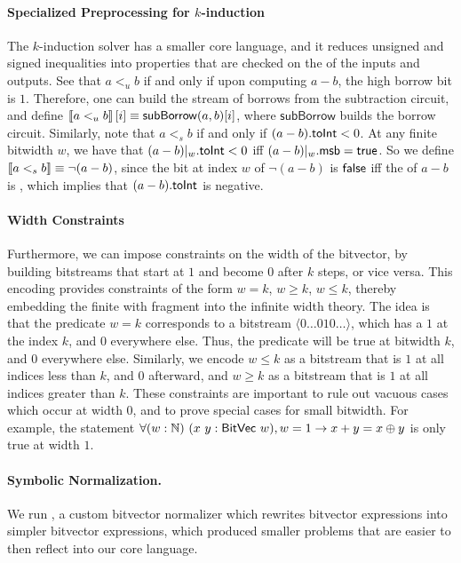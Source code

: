 \paragraph{Specialized Preprocessing for $k$-induction}
The $k$-induction solver has a smaller core language, and it reduces unsigned and signed inequalities
into properties that are checked on the \msb{} of the inputs and outputs.
See that $a <_u b$ if and only if upon computing $a - b$, the high borrow bit
is $1$. Therefore, one can build the stream of borrows from the subtraction circuit,
and define $\left\llbracket a <_u b \right\rrbracket[i] \equiv \mathsf{subBorrow}(a, b)[i]$, where $\mathsf{subBorrow}$
builds the borrow circuit. Similarly, note that $a <_s b$ if and only if $(a - b).\mathsf{toInt} < 0$.
At any finite bitwidth $w$, we have that $(a - b)|_w.\mathsf{toInt} < 0$ iff $(a - b)|_w.\mathsf{msb} = \mathsf{true}$.
So we define $\left\llbracket a <_s b \right\rrbracket \equiv \lnot (a - b)$, since the bit at index $w$  of $\lnot (a - b)$ is $\mathsf{false}$
iff the \msb of $a - b$ is \true, which implies that $(a - b).\mathsf{toInt}$ is negative.

\paragraph{Width Constraints}
Furthermore, we can impose constraints on the width of the bitvector,
by building bitstreams that start at $1$ and become $0$ after $k$ steps, or vice versa.
This encoding provides constraints of the form $w = k$, $w \geq k$, $w \leq k$,
thereby embedding the finite with fragment into the infinite width theory.
The idea is that the predicate $w = k$ corresponds to a bitstream $\langle0\dots010\dots\rangle$,
which has a $1$ at the index $k$, and $0$ everywhere else. Thus, the predicate
will be true at bitwidth $k$, and $0$ everywhere else.
Similarly, we encode $w \leq k$ as a bitstream that is $1$ at all indices less than $k$,
and $0$ afterward, and $w \geq k$ as a bitstream that is $1$ at all indices greater than $k$.
These constraints are important to rule out vacuous cases which occur at width $0$,
and to prove special cases for small bitwidth.
For example, the statement $\forall (w : \mathbb N)~(x~y : \mathsf{BitVec}~{w}), w = 1 \to x + y = x \oplus y$
is only true at width $1$.

\paragraph{Symbolic Normalization.} We run \bvnormalize{}, a custom bitvector
normalizer which rewrites bitvector expressions into simpler bitvector expressions,
which produced smaller problems that are easier to then reflect into our core language.

